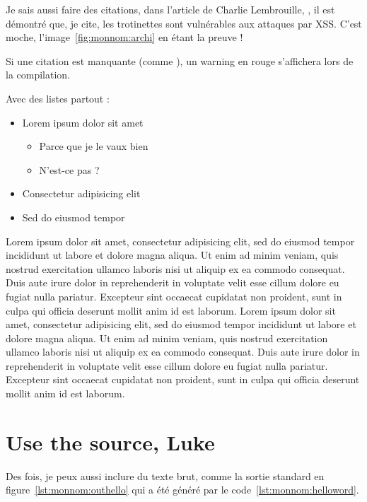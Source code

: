 
Je sais aussi faire des citations, dans l'article de Charlie
Lembrouille, \cite{monnom:charlielembrouille}, il est démontré que, je cite,
\og{}les trotinettes sont vulnérables aux attaques par XSS\fg{}. C'est
moche, l'image~\ref{fig:monnom:archi} en étant la preuve !

Si une citation est manquante (comme \cite{monnom:referencefoireuse}),
un warning en rouge s'affichera lors de la compilation.

Avec des listes partout :

\begin{itemize}
\item Lorem ipsum dolor sit amet
  \begin{itemize}
  \item Parce que je le vaux bien
  \item N'est-ce pas ?
  \end{itemize}
\item Consectetur adipisicing elit
\item Sed do eiusmod tempor
\end{itemize}

Lorem ipsum dolor sit amet, consectetur adipisicing elit, sed do
eiusmod tempor incididunt ut labore et dolore magna aliqua. Ut enim ad
minim veniam, quis nostrud exercitation ullamco laboris nisi ut
aliquip ex ea commodo consequat. Duis aute irure dolor in
reprehenderit in voluptate velit esse cillum dolore eu fugiat nulla
pariatur. Excepteur sint occaecat cupidatat non proident, sunt in
culpa qui officia deserunt mollit anim id est laborum. Lorem ipsum
dolor sit amet, consectetur adipisicing elit, sed do eiusmod tempor
incididunt ut labore et dolore magna aliqua. Ut enim ad minim veniam,
quis nostrud exercitation ullamco laboris nisi ut aliquip ex ea
commodo consequat. Duis aute irure dolor in reprehenderit in voluptate
velit esse cillum dolore eu fugiat nulla pariatur. Excepteur sint
occaecat cupidatat non proident, sunt in culpa qui officia deserunt
mollit anim id est laborum.

\section{Use the source, Luke}


Des fois, je peux aussi inclure du texte brut, comme la sortie
standard en figure~\ref{lst:monnom:outhello} qui a été généré par le
code~\ref{lst:monnom:helloword}.

